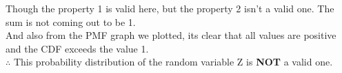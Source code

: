 \documentclass[journal,12pt,twocolumn]{IEEEtran}
\begin{document}
\begin{enumerate}[label=(\roman*)]
\begin{figure}[htb]
	\end{figure}
	      Though the property 1 is valid here, but the property 2 isn't a valid one. The sum is not coming out to be 1.\\
	      And also from the PMF graph we plotted, its clear that all values are positive and the CDF exceeds the value 1.\\
	      $\therefore$ This probability distribution of the random variable Z is \textbf{NOT} a valid one.\\
	\end{enumerate}
\end{document}
